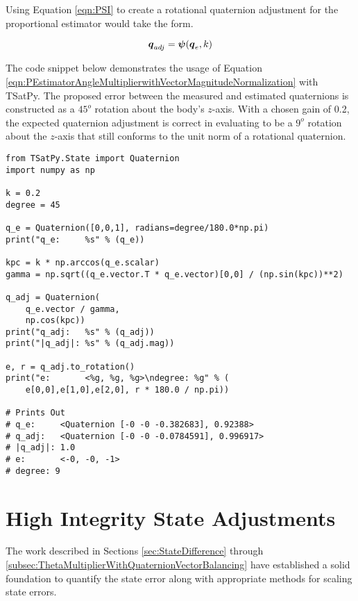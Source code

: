 Using Equation \ref{eqn:PSI} to create a rotational quaternion adjustment for the proportional estimator would take the form.

\begin{equation}
  \boldsymbol{q}_{adj} = \boldsymbol{\psi}(\boldsymbol{q}_e, k)
  \label{eqn:PEstimatorAngleMultiplierwithVectorMagnitudeNormalization}
\end{equation}

The code snippet below demonstrates the usage of Equation \ref{eqn:PEstimatorAngleMultiplierwithVectorMagnitudeNormalization} with TSatPy.  The proposed error between the measured and estimated quaternions is constructed as a $45^o$ rotation about the body's $z$-axis.  With a chosen gain of 0.2, the expected quaternion adjustment is correct in evaluating to be a $9^o$ rotation about the $z$-axis that still conforms to the unit norm of a rotational quaternion.

\begin{singlespace}
  \begin{verbatim}
from TSatPy.State import Quaternion
import numpy as np

k = 0.2
degree = 45

q_e = Quaternion([0,0,1], radians=degree/180.0*np.pi)
print("q_e:     %s" % (q_e))

kpc = k * np.arccos(q_e.scalar)
gamma = np.sqrt((q_e.vector.T * q_e.vector)[0,0] / (np.sin(kpc))**2)

q_adj = Quaternion(
    q_e.vector / gamma,
    np.cos(kpc))
print("q_adj:   %s" % (q_adj))
print("|q_adj|: %s" % (q_adj.mag))

e, r = q_adj.to_rotation()
print("e:       <%g, %g, %g>\ndegree: %g" % (
    e[0,0],e[1,0],e[2,0], r * 180.0 / np.pi))

# Prints Out
# q_e:     <Quaternion [-0 -0 -0.382683], 0.92388>
# q_adj:   <Quaternion [-0 -0 -0.0784591], 0.996917>
# |q_adj|: 1.0
# e:       <-0, -0, -1>
# degree: 9
  \end{verbatim}
\nocite{minted}
\end{singlespace}

\section{High Integrity State Adjustments}
\label{sec:HighIntegrityStateAdjustments}

The work described in Sections \ref{sec:StateDifference} through \ref{subsec:ThetaMultiplierWithQuaternionVectorBalancing} have established a solid foundation to quantify the state error along with appropriate methods for scaling state errors.

